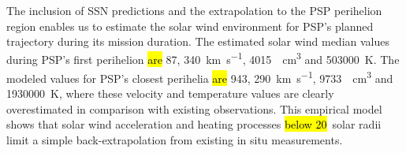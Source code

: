 {The inclusion of SSN predictions and the extrapolation to the PSP perihelion region enables us to estimate the solar wind environment for PSP's planned trajectory during its mission duration. The estimated solar wind median values during PSP's first perihelion \hl{are} \SI{87}{\nT}, \SI{340}{\km\per\s}, \SI{4015}{\per\cm\cubed} and \SI{503000}{\K}. The modeled values for PSP’s closest perihelia \hl{are} \SI{943}{\nT}, \SI{290}{\km\per\s}, \SI{9733}{\per\cm\cubed} and \SI{1930000}{\K}, where these velocity and temperature values are clearly overestimated in comparison with existing observations.}	%
{This empirical model shows that solar wind acceleration and heating processes \hl{below 20}~solar radii limit a simple back-extrapolation from existing in situ measurements.}	%


\maketitle




